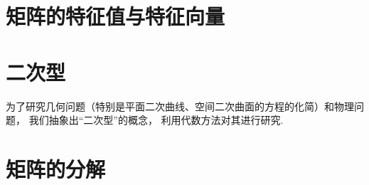 \chapter{矩阵的特征值与特征向量}











\chapter{二次型}
为了研究几何问题（特别是平面二次曲线、空间二次曲面的方程的化简）和物理问题，
我们抽象出“二次型”的概念，
利用代数方法对其进行研究.







\chapter{矩阵的分解}

